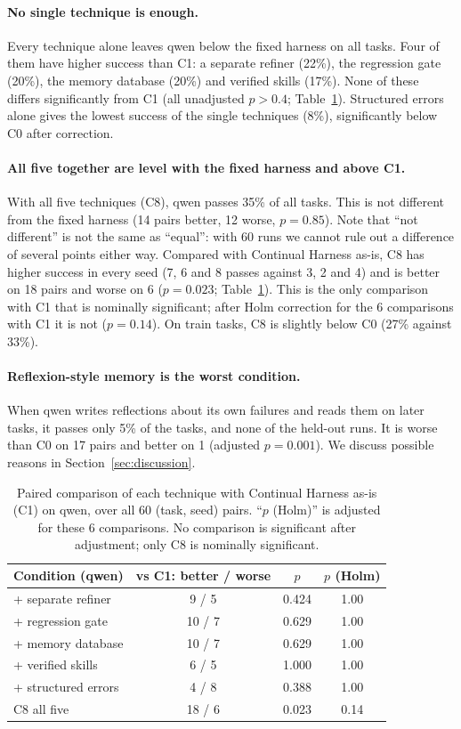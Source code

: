 \paragraph{No single technique is enough.}
Every technique alone leaves qwen below the fixed harness on all tasks. Four of them have higher
success than C1: a separate refiner (22\%), the regression gate (20\%), the memory database
(20\%) and verified skills (17\%). None of these differs significantly from C1 (all unadjusted
$p > 0.4$; Table~\ref{tab:vsc1}). Structured errors alone gives the lowest success of the single
techniques (8\%), significantly below C0 after correction.

\paragraph{All five together are level with the fixed harness and above C1.}
With all five techniques (C8), qwen passes 35\% of all tasks. This is not different from the fixed
harness (14 pairs better, 12 worse, $p = 0.85$). Note that ``not different'' is not the same as
``equal'': with 60 runs we cannot rule out a difference of several points either way. Compared with
Continual Harness as-is, C8 has higher success in every seed (7, 6 and 8 passes against 3, 2 and 4)
and is better on 18 pairs and worse on 6 ($p = 0.023$; Table~\ref{tab:vsc1}). This is the only
comparison with C1 that is nominally significant; after Holm correction for the 6 comparisons with
C1 it is not ($p = 0.14$). On train tasks, C8 is slightly below C0 (27\% against 33\%).

\paragraph{Reflexion-style memory is the worst condition.}
When qwen writes reflections about its own failures and reads them on later tasks, it passes only
5\% of the tasks, and none of the held-out runs. It is worse than C0 on 17 pairs and better on 1
(adjusted $p = 0.001$). We discuss possible reasons in Section~\ref{sec:discussion}.

\begin{table}[t]
\centering
\small
\begin{tabular}{lccc}
\toprule
Condition (qwen) & vs C1: better / worse & $p$ & $p$ (Holm) \\
\midrule
+ separate refiner  & 9 / 5  & 0.424 & 1.00 \\
+ regression gate   & 10 / 7 & 0.629 & 1.00 \\
+ memory database   & 10 / 7 & 0.629 & 1.00 \\
+ verified skills   & 6 / 5  & 1.000 & 1.00 \\
+ structured errors & 4 / 8  & 0.388 & 1.00 \\
C8 all five         & 18 / 6 & 0.023 & 0.14 \\
\bottomrule
\end{tabular}
\caption{Paired comparison of each technique with Continual Harness as-is (C1) on qwen, over all
60 (task, seed) pairs. ``$p$ (Holm)'' is adjusted for these 6 comparisons. No comparison is
significant after adjustment; only C8 is nominally significant.}
\label{tab:vsc1}
\end{table}

